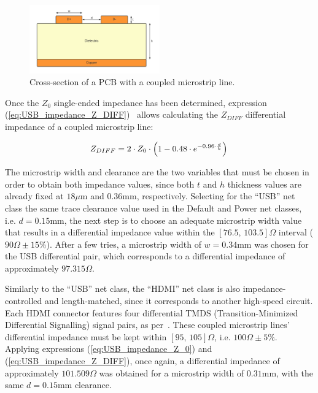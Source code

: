 \begin{figure}[h]
    \centering
    \includegraphics[width=0.5\textwidth]{Chapters/Figures/chapter5/USB_differential_pair.pdf}
    \caption{Cross-section of a PCB with a coupled microstrip line.}
    \label{fig:USB_differential_pair}
\end{figure}

Once the $Z_0$ single-ended impedance has been determined, expression (\ref{eq:USB_impedance_Z_DIFF})~\cite{USB_Routing} allows calculating the $Z_{DIFF}$ differential impedance of a coupled microstrip line:

\begin{equation}\label{eq:USB_impedance_Z_DIFF}
	Z_{DIFF} = 2 \cdot Z_0 \cdot \left(1 - 0.48 \cdot e^{-0.96 \cdot \frac{d}{h}}\right)\,\medskip
\end{equation}

\noindent The microstrip width and clearance are the two variables that must be chosen in order to obtain both impedance values, since both $t$ and $h$ thickness values are already fixed at $18 \mu$m and $0.36$mm, respectively. Selecting for the ``USB'' net class the same trace clearance value used in the Default and Power net classes, i.e. $d=0.15$mm, the next step is to choose an adequate microstrip width value that results in a differential impedance value within the $[76.5,\, 103.5]\Omega$ interval ($90\Omega \pm 15\%$). After a few tries, a microstrip width of $w=0.34$mm was chosen for the USB differential pair, which corresponds to a differential impedance of approximately $97.315 \Omega$.

Similarly to the ``USB'' net class, the ``HDMI'' net class is also impedance-controlled and length-matched, since it corresponds to another high-speed circuit. Each HDMI connector features four differential TMDS (Transition-Minimized Differential Signalling) signal pairs, as per~\cite{HDMI_Routing}. These coupled microstrip lines' differential impedance must be kept within $[95,\, 105]\Omega$, i.e. $100\Omega \pm 5\%$. Applying expressions (\ref{eq:USB_impedance_Z_0}) and (\ref{eq:USB_impedance_Z_DIFF}), once again, a differential impedance of approximately $101.509 \Omega$ was obtained for a microstrip width of $0.31$mm, with the same $d=0.15$mm clearance.



